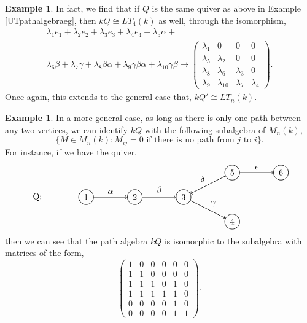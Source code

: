 \documentclass[11.5pt, twoside, a4paper, titlepage]{report}
\theoremstyle{definition}
\newtheorem{eg}[mydef]{Example}
\theoremstyle{plain}
\begin{document}
\begin{eg}
In fact, we find that if $Q$ is the same quiver as above in Example \ref{UTpathalgebraeg}, then $kQ \cong LT_4(k)$ as well, through the isomorphism,
\begin{multline*}
\lambda_1e_1+\lambda_2e_2+\lambda_3e_3+\lambda_4e_4+\lambda_5\alpha+\\
\lambda_6\beta+\lambda_7\gamma+\lambda_8\beta\alpha+\lambda_9\gamma\beta\alpha+\lambda_{10}\gamma\beta
\mapsto
\begin{pmatrix*}
\lambda_1 & 0 & 0 & 0\\
\lambda_5 & \lambda_2 & 0 & 0\\
\lambda_8 & \lambda_6 & \lambda_3 & 0\\
\lambda_9 & \lambda_{10} & \lambda_7 & \lambda_4
\end{pmatrix*}.
\end{multline*}
Once again, this extends to the general case that, $kQ' \cong LT_n(k)$.
\end{eg}

\begin{eg} \label{pathalgebramatrixeg}
In a more general case, as long as there is only one path between any two vertices, we can identify $kQ$ with the following subalgebra of $M_n(k)$,
\begin{equation*}
\{M \in M_n(k): M_{ij}=0 \text{ if there is no path from } j \text{ to }i\}.
\end{equation*}
For instance, if we have the quiver,
\begin{equation*}
\begin{tikzpicture}[->,-latex, auto, every path/.style={->, semithick}, main node/.style={draw, circle}]
\node []			(0) at (-2,0)		{Q:};
\node	[main node]		(1) at (0,0)		{1};
\node [main node]		(2) at (2,0)		{2};
\node [main node]		(3) at (4,0)		{3};
\node [main node]		(4) at (6,-1)		{4};
\node [main node]		(5) at (6,1)		{5};
\node [main node]		(6) at (8, 1)		{6};

\draw (1) edge node [auto] {$\alpha$} (2);
\draw (2) edge node [auto] {$\beta$} (3);
\draw (3) edge node [auto] {$\gamma$} (4);
\draw (5) edge node [auto, swap] {$\delta$} (3);
\draw (5) edge node [auto] {$\epsilon$} (6);
\end{tikzpicture}
\end{equation*}
then we can see that the path algebra $kQ$ is isomorphic to the subalgebra with matrices of the form,
\begin{equation*}
\begin{pmatrix*}
1 & 0 & 0 & 0 & 0 & 0 \\
1 & 1 & 0 & 0 & 0 & 0 \\
1 & 1 & 1 & 0 & 1 & 0 \\
1 & 1 & 1 & 1 & 1 & 0 \\
0 & 0 & 0 & 0 & 1 & 0 \\
0 & 0 & 0 & 0 & 1 & 1
\end{pmatrix*}.
\end{equation*}
\end{eg}
\end{document}
